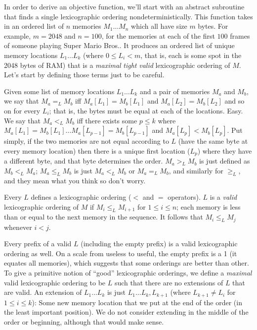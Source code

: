 \documentclass[twocolumn]{article}
\begin{document}
In order to derive an objective function, we'll start with an abstract
subroutine that finds a single lexicographic ordering
nondeterministically. This function takes in an ordered list of $n$
memories $M_1\ldots M_n$ which all have size $m$ bytes. For example,
$m = 2048$ and $n = 100$, for the memories at each of the first $100$
frames of someone playing Super Mario Bros.. It produces an ordered
list of unique memory locations $L_1 \ldots L_k$ (where $0 \leq L_i <
m$, that is, each is some spot in the 2048 bytes of RAM) that is a
{\em maximal} {\em tight} {\em valid} lexicographic ordering of $M$.
Let's start by defining those terms just to be careful.

Given some list of memory locations $L_1 \ldots L_k$ and a pair of
memories $M_a$ and $M_b$, we say that $M_a =_L M_b$ iff $M_a[L_1] =
M_b[L_1]$ and $M_a[L_2] = M_b[L_2]$ and so on for every $L_i$; that
is, the bytes must be equal at each of the locations. Easy. We say
that $M_a <_L M_b$ iff there exists some $p \leq k$ where $M_a[L_1] =
M_b[L_1] \ldots M_a[L_{p-1}] = M_b[L_{p-1}]$ and $M_a[L_p] <
M_b[L_p]$. Put simply, if the two memories are not equal according to
$L$ (have the same byte at every memory location) then there is a
unique first location ($L_p$) where they have a different byte, and
that byte determines the order. $M_a >_L M_b$ is just defined as $M_b <_L
M_a$; $M_a \leq_L M_b$ is just $M_a <_L M_b$ or $M_a =_L M_b$, and similarly
for $\geq_L$, and they mean what you think so don't worry.

Every $L$ defines a lexicographic ordering ($<$ and $=$ operators).
$L$ is a {\em valid} lexicographic ordering of $M$ if $M_i \leq_L M_{i
  + 1}$ for $1 \leq i \leq n$; each memory is less than or equal to
the next memory in the sequence. It follows that $M_i \leq_L M_j$
whenever $i < j$.

Every prefix of a valid $L$ (including the empty prefix) is a valid
lexicographic ordering as well. On a scale from useless to useful, the
empty prefix is a 1 (it equates all memories), which suggests that
some orderings are better than other. To give a primitive notion of
``good'' lexicographic orderings, we define a {\em maximal} valid
lexicographic ordering to be $L$ such that there are no extensions of
$L$ that are valid. An extension of $L_1 \ldots L_k$ is just $L_1
\ldots L_k, L_{k+1}$ (where $L_{k+1} \neq L_i$ for $1 \leq i \leq k$):
Some new memory location that we put at the end of the order (in the
least important position). We do not consider extending in the middle
of the order or beginning, although that would make sense.
\end{document}
